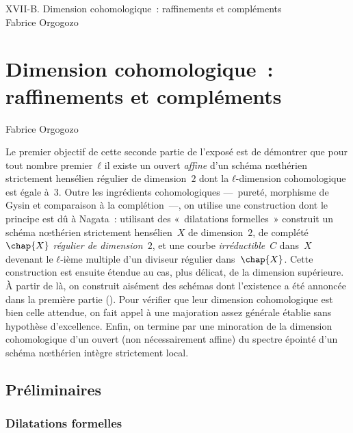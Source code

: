 \documentclass[10pt]{../fichiers-configuration-latex/smfart}
\begin{document}
\begin{center}
XVII-B. Dimension cohomologique : raffinements et compléments\\
Fabrice Orgogozo
\end{center}

\version
\tableofcontents

\else
{}
\chapter{Dimension cohomologique : raffinements et compléments}
\begin{center}
Fabrice Orgogozo
\end{center}
\fi

\newcommand{\initial}{\mathop{\mathrm{in}}}

Le premier objectif de cette seconde partie de l'exposé est de
démontrer que pour tout nombre premier $ℓ$ il existe un ouvert
\emph{affine} d'un schéma nœthérien strictement hensélien régulier de
dimension $2$ dont la $ℓ$-dimension cohomologique est égale à $3$.
Outre les ingrédients cohomologiques — pureté, morphisme de Gysin et
comparaison à la complétion —, on utilise une construction dont le
principe est dû à Nagata : utilisant des « dilatations formelles »
construit un schéma nœthérien strictement hensélien $X$ de
dimension $2$, de complété $\chap{X}$ \emph{régulier de
dimension $2$}, et une courbe \emph{irréductible} $C$ dans $X$
devenant le $ℓ$-ième multiple d'un diviseur régulier dans $\chap{X}$.
Cette construction est ensuite étendue au cas, plus délicat, de la
dimension supérieure. À partir de là, on construit
aisément des schémas dont l'existence a été annoncée
dans la première partie ().
Pour vérifier que leur dimension cohomologique est bien celle
attendue, on fait appel à une majoration
assez générale établie sans hypothèse d'excellence.
Enfin, on termine par une minoration de la dimension
cohomologique d'un ouvert (non nécessairement
affine) du spectre épointé d'un schéma nœthérien intègre
strictement local.

\section{Préliminaires}

\subsection{Dilatations formelles}
\label{18B-dilatations-formelles}
\end{document}
